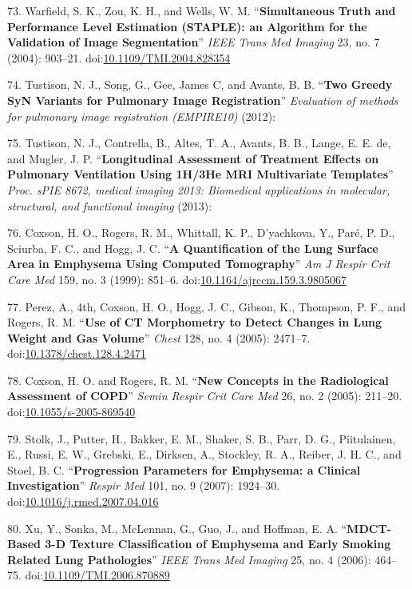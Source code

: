 \documentclass[11pt,]{article}
\begin{document}
73. Warfield, S. K., Zou, K. H., and Wells, W. M. ``\textbf{Simultaneous
Truth and Performance Level Estimation (STAPLE): an Algorithm for the
Validation of Image Segmentation}'' \emph{IEEE Trans Med Imaging} 23,
no. 7 (2004): 903--21.
doi:\href{http://dx.doi.org/10.1109/TMI.2004.828354}{10.1109/TMI.2004.828354}

74. Tustison, N. J., Song, G., Gee, James C, and Avants, B. B.
``\textbf{Two Greedy SyN Variants for Pulmonary Image Registration}''
\emph{Evaluation of methods for pulmonary image registration (EMPIRE10)}
(2012):

75. Tustison, N. J., Contrella, B., Altes, T. A., Avants, B. B., Lange,
E. E. de, and Mugler, J. P. ``\textbf{Longitudinal Assessment of
Treatment Effects on Pulmonary Ventilation Using 1H/3He MRI Multivariate
Templates}'' \emph{Proc. sPIE 8672, medical imaging 2013: Biomedical
applications in molecular, structural, and functional imaging} (2013):

76. Coxson, H. O., Rogers, R. M., Whittall, K. P., D'yachkova, Y.,
Par{é}, P. D., Sciurba, F. C., and Hogg, J. C. ``\textbf{A
Quantification of the Lung Surface Area in Emphysema Using Computed
Tomography}'' \emph{Am J Respir Crit Care Med} 159, no. 3 (1999):
851--6.
doi:\href{http://dx.doi.org/10.1164/ajrccm.159.3.9805067}{10.1164/ajrccm.159.3.9805067}

77. Perez, A., 4th, Coxson, H. O., Hogg, J. C., Gibson, K., Thompson, P.
F., and Rogers, R. M. ``\textbf{Use of CT Morphometry to Detect Changes
in Lung Weight and Gas Volume}'' \emph{Chest} 128, no. 4 (2005):
2471--7.
doi:\href{http://dx.doi.org/10.1378/chest.128.4.2471}{10.1378/chest.128.4.2471}

78. Coxson, H. O. and Rogers, R. M. ``\textbf{New Concepts in the
Radiological Assessment of COPD}'' \emph{Semin Respir Crit Care Med} 26,
no. 2 (2005): 211--20.
doi:\href{http://dx.doi.org/10.1055/s-2005-869540}{10.1055/s-2005-869540}

79. Stolk, J., Putter, H., Bakker, E. M., Shaker, S. B., Parr, D. G.,
Piitulainen, E., Russi, E. W., Grebski, E., Dirksen, A., Stockley, R.
A., Reiber, J. H. C., and Stoel, B. C. ``\textbf{Progression Parameters
for Emphysema: a Clinical Investigation}'' \emph{Respir Med} 101, no. 9
(2007): 1924--30.
doi:\href{http://dx.doi.org/10.1016/j.rmed.2007.04.016}{10.1016/j.rmed.2007.04.016}

80. Xu, Y., Sonka, M., McLennan, G., Guo, J., and Hoffman, E. A.
``\textbf{MDCT-Based 3-D Texture Classification of Emphysema and Early
Smoking Related Lung Pathologies}'' \emph{IEEE Trans Med Imaging} 25,
no. 4 (2006): 464--75.
doi:\href{http://dx.doi.org/10.1109/TMI.2006.870889}{10.1109/TMI.2006.870889}
\end{document}
